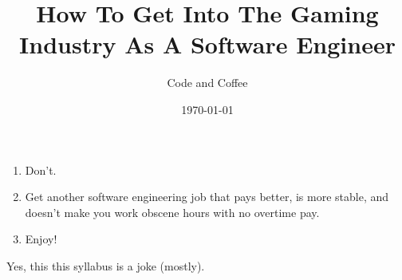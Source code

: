\documentclass[40pt]{article}
\title{How To Get Into The Gaming Industry As A Software Engineer}
\author{Code and Coffee}
\date{\today}
\begin{document}
\maketitle

\begin{enumerate}
\item Don't.
\item Get another software engineering job that pays better, is more stable, and doesn't make you work obscene hours with no overtime pay.
\item Enjoy!
\end{enumerate}

Yes, this this syllabus is a joke (mostly).
\end{document}
